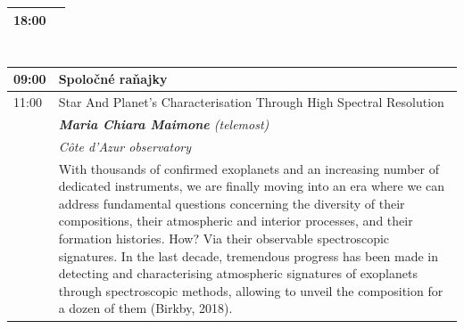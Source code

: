 \documentclass[a4paper]{report}
\begin{document}
        \begin{tabularx}{\textwidth}{>{}p{2cm} >{\RaggedRight}X}
            \toprule
                            {\Large 18:00} & {\Large } \\
                                                                                                        \bottomrule
        \end{tabularx}

            \section{\color[rgb]{0, 0.1, 0.4}{nedeľa}}

        \begin{tabularx}{\textwidth}{>{}p{2cm} >{\RaggedRight}X}
            \toprule
                            {\Large 09:00} & {\Large Spoločné raňajky} \\
                                                                                \midrule                            {\Large 11:00} & {\Large Star And Planet’s Characterisation Through High Spectral Resolution} \\
                                            & \textit{\textbf{Maria Chiara Maimone} (telemost)} \\
                                                                & \textit{Côte d’Azur observatory} \\
                                                                & With thousands of confirmed exoplanets and an increasing number of dedicated instruments, we are finally moving into an era where we can address fundamental questions concerning the diversity of their compositions, their atmospheric and interior processes, and their formation histories. How? Via their observable spectroscopic signatures. In the last decade, tremendous progress has been made in detecting and characterising atmospheric signatures of exoplanets through spectroscopic methods, allowing to unveil the composition for a dozen of them (Birkby, 2018).

\end{tabularx}
\end{document}
